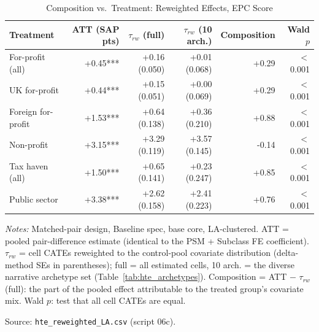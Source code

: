 \begin{table}[htbp]
\centering
\caption{Composition vs.\ Treatment: Reweighted Effects, EPC Score}
\label{tab:hte_reweighted_current_energy_efficiency}
\small
\begin{tabular}{lrrrrr}
\toprule
Treatment & ATT (SAP pts) & $\tau_{rw}$ (full) & $\tau_{rw}$ (10 arch.) & Composition & Wald $p$ \\
\midrule
For-profit (all) & +0.45*** & +0.16 (0.050) & +0.01 (0.068) & +0.29 & $<$0.001 \\
UK for-profit & +0.44*** & +0.15 (0.051) & +0.00 (0.069) & +0.29 & $<$0.001 \\
Foreign for-profit & +1.53*** & +0.64 (0.138) & +0.36 (0.210) & +0.88 & $<$0.001 \\
Non-profit & +3.15*** & +3.29 (0.119) & +3.57 (0.145) & -0.14 & $<$0.001 \\
Tax haven (all) & +1.50*** & +0.65 (0.141) & +0.23 (0.247) & +0.85 & $<$0.001 \\
Public sector & +3.38*** & +2.62 (0.158) & +2.41 (0.223) & +0.76 & $<$0.001 \\
\bottomrule
\end{tabular}
\begin{minipage}{0.95\textwidth}
\vspace{4pt}
\footnotesize
\textit{Notes:} Matched-pair design, Baseline spec, base core, LA-clustered.
ATT = pooled pair-difference estimate (identical to the PSM + Subclass FE
coefficient). $\tau_{rw}$ = cell CATEs reweighted to the control-pool covariate
distribution (delta-method SEs in parentheses); full = all estimated cells,
10 arch. = the diverse narrative archetype set (Table~\ref{tab:hte_archetypes}).
Composition = ATT $-$ $\tau_{rw}$ (full):
the part of the pooled effect attributable to the treated group's covariate mix.
Wald $p$: test that all cell CATEs are equal.

Source: \texttt{hte\_reweighted\_LA.csv} (script 06c).
\end{minipage}
\end{table}
